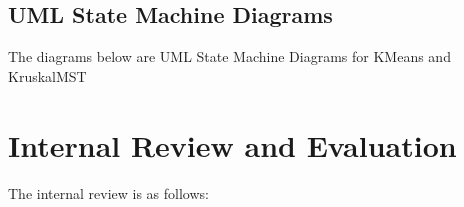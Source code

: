 \documentclass[12pt]{article}
\begin{document}
\newpage
\subsection{UML State Machine Diagrams}
The diagrams below are UML State Machine Diagrams for KMeans and KruskalMST

\newpage
\section{Internal Review and Evaluation}
The internal review is as follows:
\end{document}
